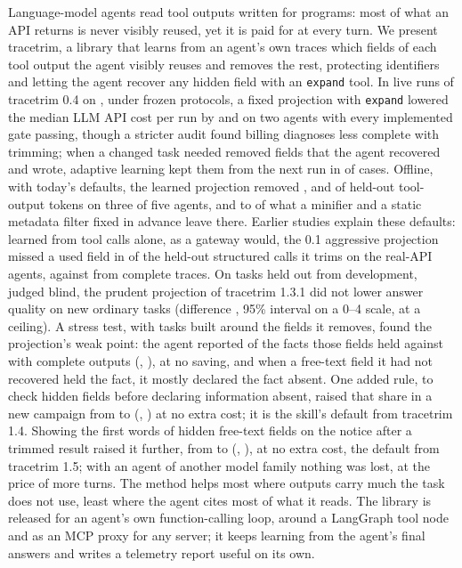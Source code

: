 Language-model agents read tool outputs written for programs: most of what an API returns is never visibly reused,
yet it is paid for at every turn. We present tracetrim, a library that learns from an agent's own traces which
fields of each tool output the agent visibly reuses and removes the rest, protecting identifiers and letting the
agent recover any hidden field with an \texttt{expand} tool. In live runs of tracetrim 0.4 on \texttt{\SthreeModelA},
under frozen protocols, a fixed projection with \texttt{expand} lowered the median LLM API cost per run by
\SthreeEOneTrimCosti{} and \SthreeEOneTrimCostiv{} on two agents with every implemented gate passing, though a
stricter audit found billing diagnoses less complete with trimming; when a changed task needed removed fields that
the agent recovered and wrote, adaptive learning kept them from the next run in \SthreeHFiveKept{} of
\SthreeHFiveRecoveries{} cases. Offline, with today's defaults, the learned projection removed \BaseLearnedRawi,
\BaseLearnedRawiii{} and \BaseLearnedRawv{} of held-out tool-output tokens on three of five agents, and
\BaseLearnedStaticBigMin{} to \BaseLearnedStaticBigMax{} of what a minifier and a static metadata filter fixed in
advance leave there. Earlier studies explain these defaults: learned from tool calls alone, as a gateway would, the
0.1 aggressive projection missed a used field in \MissesPooledShareRealCalls{} of the held-out structured calls it
trims on the real-API agents, against \MissesPooledShareRealFull{} from complete traces. On tasks held out from development, judged blind, the prudent projection of tracetrim 1.3.1 did not lower
answer quality on new ordinary tasks (difference \SfourAPoint{}, 95\% interval \SfourACI{} on a 0--4 scale, at a
ceiling). A stress test, with tasks built around the fields it removes, found the projection's weak point: the agent
reported \SfourBHiddenP{} of the facts those fields held against \SfourBHiddenR{} with complete outputs
(\SfourBPoint{}, \SfourBCI{}), at no saving, and when a free-text field it had not recovered held the fact, it
mostly declared the fact absent. One added rule, to check hidden fields before declaring information absent, raised
that share in a new campaign from \SfourCHiddenPone{} to \SfourCHiddenPtwo{} (\SfourCPoint{}, \SfourCCI{}) at no
extra cost; it is the skill's default from tracetrim 1.4. Showing the first words of hidden free-text fields on
the notice after a trimmed result raised it further, from \SfourEHiddenPtwo{} to \SfourEHiddenPtwoT{}
(\SfourEPoint{}, \SfourECI{}), at no extra cost, the default from tracetrim 1.5; with an agent of another model
family nothing was lost, at the price of more turns. The method helps most where outputs carry much the task
does not use, least where the agent cites most of what it reads. The library is released for an agent's own
function-calling loop, around a LangGraph tool node and as an MCP proxy for any server; it keeps learning from the agent's final answers and
writes a telemetry report useful on its own.
